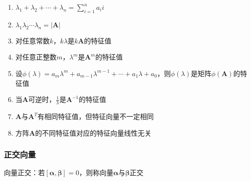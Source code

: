 \documentclass[12pt]{book}
\begin{document}
\begin{enumerate}[(1)]
    \item $\lambda_1+\lambda_2+\cdots+\lambda_n=\sum_{i=1}^{n}{a_ii}$
    \item $\lambda_{1}\lambda_{2}\cdots\lambda_{n}=|\bm{A}|$
    \item 对任意常数$k$，$k\lambda$是$k\bm{A}$的特征值 
    \item 对任意正整数$m$，$\lambda^m$是$\bm{A}^m$的特征值 
    \item 设$\phi(\lambda)=a_{m}\lambda^{m}+a_{m-1}\lambda^{m-1}+\cdots+a_{1}\lambda+a_{0}$，则$\phi(\lambda)$是矩阵$\phi(\bm{A})$的特征值
    \item 当$\bm{A}$可逆时，$\frac{1}{\lambda}$是$\bm{A}^{-1}$的特征值
    \item $\bm{A}$与$\bm{A}^T$有相同特征值，但特征向量不一定相同
    \item 方阵$\bm{A}$的不同特征值对应的特征向量线性无关
\end{enumerate}




\subsubsection{正交向量}

向量正交：若$[\bm{\alpha},\bm{\beta}]=0$，则称向量$\bm{\alpha}$与$\bm{\beta}$正交
\end{document}
